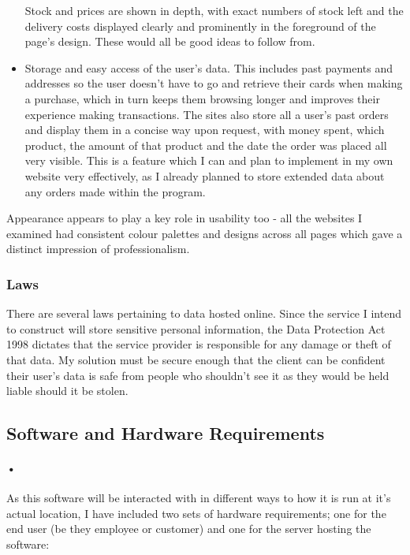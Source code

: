 ﻿\documentclass{article}
\begin{document}
\begin{itemize}
    Stock and prices are shown in depth, with exact numbers of stock left and the delivery costs displayed clearly and prominently in the foreground of the page's design.
    These would all be good ideas to follow from.
    \item Storage and easy access of the user's data.
    This includes past payments and addresses so the user doesn't have to go and retrieve their cards when making a purchase, which in turn keeps them browsing longer and improves their experience making transactions.
    The sites also store all a user's past orders and display them in a concise way upon request, with money spent, which product, the amount of that product and the date the order was placed all very visible.
    This is a feature which I can and plan to implement in my own website very effectively, as I already planned to store extended data about any orders made within the program.
    \end{itemize}
    Appearance appears to play a key role in usability too - all the websites I examined had consistent colour palettes and designs across all pages which gave a distinct impression of professionalism.
    \subsubsection{Laws}
    There are several laws pertaining to data hosted online.
    Since the service I intend to construct will store sensitive personal information, the Data Protection Act 1998 dictates that the service provider is responsible for any damage or theft of that data.
    My solution must be secure enough that the client can be confident their user's data is safe from people who shouldn't see it as they would be held liable should it be stolen.
    \subsection{Software and Hardware Requirements}
    \paragraph{•}
    As this software will be interacted with in different ways to how it is run at it’s actual location, I have included two sets of hardware requirements; one for the end user (be they employee or customer) and one for the server hosting the software:
    
\end{document}
